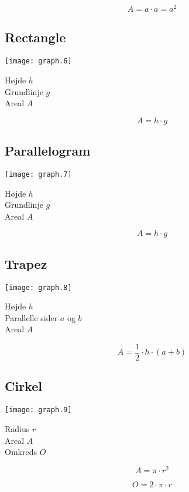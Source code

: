 \documentclass[11pt,a4paper,landscape,twocolumn,fleqn,leqno]{article}
\begin{document}
\begin{equation}
A = a \cdot a = a^2
\end{equation}

\vfill

\subsection{Rectangle}

\texttt{[image: graph.6]}

Højde $h$ \\
Grundlinje $g$ \\
Areal $A$

\begin{equation}
A = h \cdot g
\end{equation}

\vfill

\subsection{Parallelogram}

\texttt{[image: graph.7]}

Højde $h$ \\
Grundlinje $g$ \\
Areal $A$

\begin{equation}
A = h \cdot g
\end{equation}

\vfill

\subsection{Trapez}

\texttt{[image: graph.8]}

Højde $h$ \\
Parallelle sider $a$ og $b$ \\
Areal $A$

\begin{equation}
A = \frac{1}{2} \cdot h \cdot (a + b)
\end{equation}

\vfill

\subsection{Cirkel}

\texttt{[image: graph.9]}

Radius $r$ \\
Areal $A$ \\
Omkreds $O$

\begin{equation}
A = \pi \cdot r^2
\end{equation}

\begin{equation}
O = 2 \cdot \pi \cdot r
\end{equation}

\vfill
\end{document}

